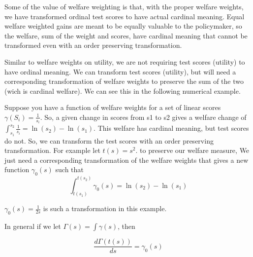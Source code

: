\documentclass[letterpaper,12pt]{article}
\begin{document}
Some of the value of welfare weighting is that, with the proper welfare weights, we have transformed ordinal test scores to have actual cardinal meaning. Equal welfare weighted gains are meant to be equally valuable to the policymaker, so the welfare, sum of the weight and scores, have cardinal meaning that cannot be transformed even with an order preserving transformation. 

Similar to welfare weights on utility, we are not requiring test scores (utility) to have ordinal meaning. We can transform test scores (utility), but will need a corresponding transformation of welfare weights to preserve the sum of the two (wich is cardinal welfare). We can see this in the following numerical example. 

Suppose you have a function of welfare weights for a set of linear scores $\gamma(S_i) = \frac{1}{s_i}$. So, a given change in scores from s1 to s2 gives a welfare change of $\int_{s_1}^{s_2} \frac{1}{s_i} = \ln(s_2)-\ln(s_1)$. This welfare has cardinal meaning, but test scores do not. So, we can transform the test scores with an order preserving transformation. For example let $t(s) = s^2$. to preserve our welfare measure, We just need a corresponding transformation of the welfare weights that gives a new function $\gamma_0(s)$ such that 
$$\int_{t(s_1)}^{t(s_2)}\gamma_0(s)  = \ln(s_2)-\ln(s_1)$$

$\gamma_0(s) = \frac{1}{2s}$ is such a transformation in this example. 

In general if we let $\Gamma(s) = \int \gamma(s)$, then 

$$ \frac{d \Gamma(t(s)) }{ ds} = \gamma_0(s) $$
\end{document}

